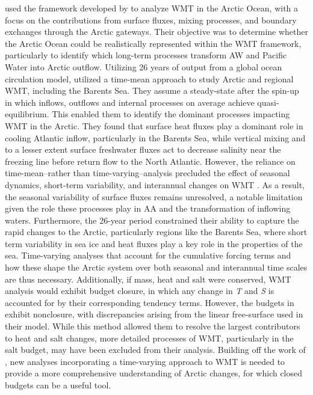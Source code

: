 \documentclass[draft]{agujournal2019}
\begin{document}
 used the framework developed by  to analyze WMT in the Arctic Ocean, with a focus on the contributions from surface fluxes, mixing processes, and boundary exchanges through the Arctic gateways. Their objective was to determine whether the Arctic Ocean could be realistically represented within the WMT framework, particularly to identify which long-term processes transform AW and Pacific Water into Arctic outflow. Utilizing 26 years of output from a global ocean circulation model,  utilized a time-mean approach to study Arctic and regional WMT, including the Barents Sea. They assume a steady-state after the spin-up in which inflows, outflows and internal processes on average achieve quasi-equilibrium. This enabled them to identify the dominant processes impacting WMT in the Arctic. They found that surface heat fluxes play a dominant role in cooling Atlantic inflow, particularly in the Barents Sea, while vertical mixing and to a lesser extent surface freshwater fluxes act to decrease salinity near the freezing line before return flow to the North Atlantic. However, the reliance on time-mean--rather than time-varying--analysis precluded the effect of seasonal dynamics, short-term variability, and interannual changes on WMT \cite{Tsubouchi2018}. As a result, the seasonal variability of surface fluxes remains unresolved, a notable limitation given the role these processes play in AA and the transformation of inflowing waters. Furthermore, the 26-year period constrained their ability to capture the rapid changes to the Arctic, particularly regions like the Barents Sea, where short term variability in sea ice and heat fluxes play a key role in the properties of the sea. Time-varying analyses that account for the cumulative forcing terms and how these shape the Arctic system over both seasonal and interannual time scales are thus necessary. Additionally, if mass, heat and salt were conserved, WMT analysis would exhibit budget closure, in which any change in \emph{T} and \emph{S} is accounted for by their corresponding tendency terms. However, the budgets in  exhibit nonclosure, with discrepancies arising from the linear free-surface used in their model. While this method allowed them to resolve the largest contributors to heat and salt changes, more detailed processes of WMT, particularly in the salt budget, may have been excluded from their analysis. Building off the work of , new analyses incorporating a time-varying approach to WMT is needed to provide a more comprehensive understanding of Arctic changes, for which closed budgets can be a useful tool.
\end{document}
